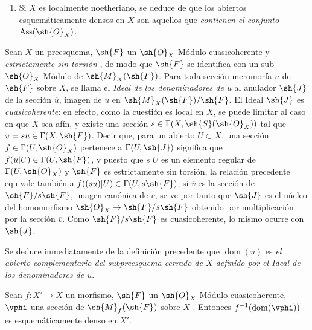 \begin{remarks}[20.2.13]
\begin{enumerate}[label=(\roman*)]
  Queda por dar un ejemplo de un anillo $A$ que tenga las propiedades precedentes.
  Basta considerar un anillo local íntegro $B$ de dimensión $\geq2$ y de cuerpo residual $k$, y tomar $A=B\oplus k$ con la ley de multiplicación $(b,x)(b',x')=(bb',bx'+b'x)$.

  \item Si $X$ es localmente noetheriano, se deduce de  que los abiertos esquemáticamente densos en $X$ son aquellos que \emph{contienen el conjunto} $\operatorname{Ass}(\sh{O}_X)$.
\end{enumerate}
\end{remarks}

\begin{env}[20.2.14]
\label{IV.20.2.14}
Sean $X$ un preesquema, $\sh{F}$ un $\sh{O}_X$-Módulo cuasicoherente y \emph{estrictamente sin torsión} , de modo que $\sh{F}$ se identifica con un sub-$\sh{O}_X$-Módulo de $\sh{M}_X(\sh{F})$.
Para toda sección meromorfa $u$ de $\sh{F}$ sobre $X$, se llama el \emph{Ideal de los denominadores de $u$} al anulador $\sh{J}$ de la sección $\overline{u}$, imagen de $u$ en $\sh{M}_X(\sh{F})/\sh{F}$.
El Ideal $\sh{J}$ es \emph{cuasicoherente}: en efecto, como la cuestión es local en $X$, se puede limitar al caso en que $X$ sea afín, y existe una sección $s\in\Gamma(X,\sh{S}(\sh{O}_X))$ tal que $v=su\in\Gamma(X,\sh{F})$.
Decir que, para un abierto $U\subset X$, una sección $f\in\Gamma(U,\sh{O}_X)$ pertenece a $\Gamma(U,\sh{J})$ significa que $f(u|U)\in\Gamma(U,\sh{F})$, y puesto que $s|U$ es un elemento regular de $\Gamma(U,\sh{O}_X)$ y $\sh{F}$ es estrictamente sin torsión, la relación precedente equivale también a $f((su)|U)\in\Gamma(U,s\sh{F})$; si $\overline{v}$ es la sección de $\sh{F}/s\sh{F}$, imagen canónica de $v$, se ve por tanto que $\sh{J}$ es el núcleo del homomorfismo $\sh{O}_X\to\sh{F}/s\sh{F}$ obtenido por multiplicación por la sección $\overline{v}$.
Como $\sh{F}/s\sh{F}$ es cuasicoherente, lo mismo ocurre con $\sh{J}$.

Se deduce inmediatamente de la definición precedente que $\operatorname{dom}(u)$ es \emph{el abierto complementario del subpreesquema cerrado de $X$ definido por el Ideal de los denominadores de $u$}.
\end{env}

\begin{proposition}[20.2.15]
\label{IV.20.2.15}
Sean $f:X'\to X$ un morfismo, $\sh{F}$ un $\sh{O}_X$-Módulo cuasicoherente, $\vphi$ una sección de $\sh{M}_f(\sh{F})$ sobre $X$ .
Entonces $f^{-1}(\operatorname{dom}(\vphi))$ es esquemáticamente denso en $X'$.
\end{proposition}

